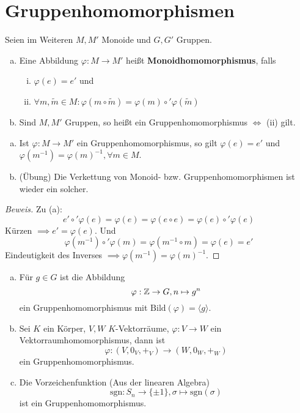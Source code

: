 \documentclass[a4paper]{report}
\begin{document}
\section{Gruppenhomomorphismen}%
\label{sec:Gruppenhomomorphismen}
Seien im Weiteren $M, M'$ Monoide und $G, G'$ Gruppen.
\begin{defi} \item
  \begin{enumerate}[(a)]
    \item Eine Abbildung $\varphi : M \to M'$ heißt \textbf{Monoidhomomorphismus}, falls
          \begin{enumerate}[(i)]
            \item $\varphi(e) = e'$ und
                  \item $\forall m , \tilde m \in M : \varphi(m \circ \tilde m) = \varphi(m) \circ' \varphi(\tilde m)$
          \end{enumerate}
          \item Sind $M, M'$ Gruppen, so heißt ein Gruppenhomomorphismus $\iff$ (ii) gilt.
  \end{enumerate}
\end{defi}
\begin{bem} \item
 \begin{enumerate}[(a)]
   \item Ist $\varphi : M \to M'$ ein Gruppenhomomorphismus, so gilt $\varphi(e)=e'$ und $\varphi(m^{-1}) = \varphi(m)^{-1}, \forall m \in M$.
         \item (Übung) Die Verkettung von Monoid- bzw. Gruppenhomomorphismen ist wieder ein solcher.
 \end{enumerate}
 \begin{proof}[Beweis]
Zu (a): $$e' \circ' \varphi(e) = \varphi(e) = \varphi(e \circ e) = \varphi(e) \circ' \varphi(e)$$
Kürzen $\implies e' = \varphi(e)$. Und $$\varphi(m^{-1})\circ' \varphi(m) = \varphi(m^{-1} \circ m) = \varphi(e) = e'$$
Eindeutigkeit des Inverses $\implies \varphi(m^{-1}) = \varphi(m)^{-1}$.
 \end{proof}
\end{bem}
\begin{bsp}
  \begin{enumerate}[(a)]
    \item Für $g \in G$ ist die Abbildung
          $$\varphi: \Bbb Z \to G, n \mapsto g^{n}$$
          ein Gruppenhomomorphismus mit $\mathrm{Bild}(\varphi) = \langle g \rangle$.
    \item Sei $K$ ein Körper, $V, W$ $K$-Vektorräume, $\varphi : V \to W$ ein Vektorraumhomomorphismus, dann ist
          $$\varphi : (V, 0_{V}, +_{V}) \to (W, 0_{W}, +_{W})$$
          ein Gruppenhomomorphismus.
    \item Die Vorzeichenfunktion (Aus der linearen Algebra)
          $$\mathrm{sgn}: S_{n} \to \{\pm 1\}, \sigma \mapsto \mathrm{sgn}(\sigma)$$
          ist ein Gruppenhomomorphismus.
  \end{enumerate}
\end{bsp}
\end{document}
